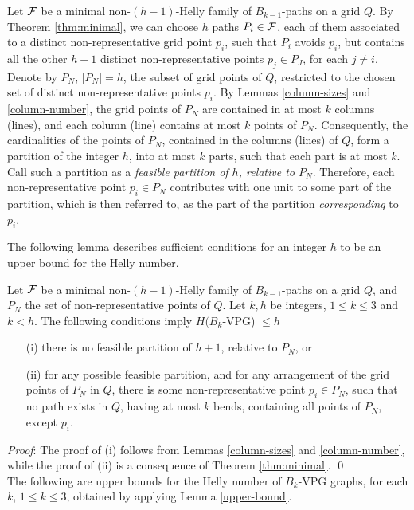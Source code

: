 Let $\cal F$ be a minimal non-$(h-1)$-Helly family of $B_{k-1}$-paths on a grid $Q$. By Theorem \ref{thm:minimal},  we can choose $h$ paths $P_i \in {\cal F}$, each of them associated to a distinct non-representative grid point $p_i$, such that $P_i$ avoids $p_i$, but contains all the other $h-1$ distinct non-representative points $p_j \in P_J$, for each   $j \neq i$. Denote by $P_N$, $|P_N|=h$, the subset of grid  points of  $Q$, restricted to the chosen set of distinct  non-representative points $p_i$. By Lemmas \ref{column-sizes} and \ref{column-number}, the grid points of $P_N$ are contained in at most $k$ columns (lines), and each column (line) contains at most $k$ points of $P_N$. Consequently, the cardinalities of the points of $P_N$, contained in the columns (lines) of $Q$,  form a partition of the integer $h$, into at most $k$ parts, such that each part is at most $k$. Call such a partition as a {\it feasible  partition  of $h$, relative to $P_N$}. Therefore, each non-representative point $p_i \in P_N$ contributes with one unit to some part of the partition, which is then referred to,   as the part of the partition {\it corresponding} to $p_i$.    

The following lemma describes sufficient conditions for an integer $h$ to be an upper bound for the Helly number.

\begin{lemma}\label{upper-bound} Let $\cal F$ be a minimal non-$(h-1)$-Helly family of $B_{k-1}$-paths on a grid $Q$, and $P_N$ the set of non-representative points of $Q$. Let $k,h$ be integers, $1 \leq k \leq 3$ and $k < h$. The following conditions imply $H(B_k$-VPG) $\leq h$  
\begin{itemize}
    \item[(i)] there is no feasible partition of $h+1$, relative to $P_N$, or 
    \item[(ii)] for any possible feasible partition, and for any arrangement of the grid points of $P_N$ in $Q$, there is some non-representative point $p_i \in P_N$, such that  no path exists  in $Q$, having at most $k$ bends, containing all points of $P_N$, except $p_i$.    
\end{itemize}
\end{lemma}
{\it Proof}: The proof of (i) follows from Lemmas \ref{column-sizes} and \ref{column-number}, while the proof of (ii) is a consequence of Theorem \ref{thm:minimal}.  \qed \\

The following are upper bounds for the Helly number of $B_k$-VPG graphs, for each $k$, $1 \leq k \leq 3$, obtained  by applying Lemma \ref{upper-bound}.      
 
